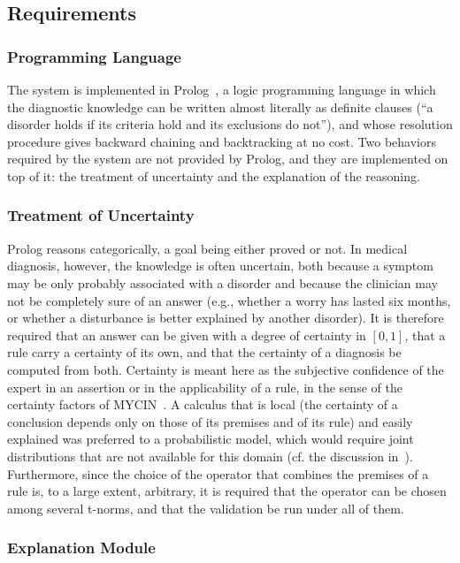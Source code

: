 \subsection{Requirements}

\subsubsection{Programming Language}

The system is implemented in Prolog~\cite{sterling-shapiro}, a logic
programming language in which the diagnostic knowledge can be written almost
literally as definite clauses (``a disorder holds if its criteria hold and its
exclusions do not''), and whose resolution procedure gives backward chaining and
backtracking at no cost. Two behaviors required by the system are not provided
by Prolog, and they are implemented on top of it: the treatment of uncertainty
and the explanation of the reasoning.

\subsubsection{Treatment of Uncertainty}

Prolog reasons categorically, a goal being either proved or not. In medical
diagnosis, however, the knowledge is often uncertain, both because a symptom may
be only probably associated with a disorder and because the clinician may not be
completely sure of an answer (e.g., whether a worry has lasted six months, or
whether a disturbance is better explained by another disorder). It is therefore
required that an answer can be given with a degree of certainty in $[0,1]$,
that a rule carry a certainty of its own, and that the certainty of a diagnosis
be computed from both. Certainty is meant here as the subjective confidence of
the expert in an assertion or in the applicability of a rule, in the sense of
the certainty factors of MYCIN~\cite{shortliffe-buchanan}. A calculus that is
local (the certainty of a conclusion depends only on those of its premises and
of its rule) and easily explained was preferred to a probabilistic model, which
would require joint distributions that are not available for this domain (cf.
the discussion in~\cite{heckerman}).
Furthermore, since the choice of the operator that combines the premises of a
rule is, to a large extent, arbitrary, it is required that the operator can be
chosen among several t-norms, and that the validation be run under all of them.

\subsubsection{Explanation Module}

